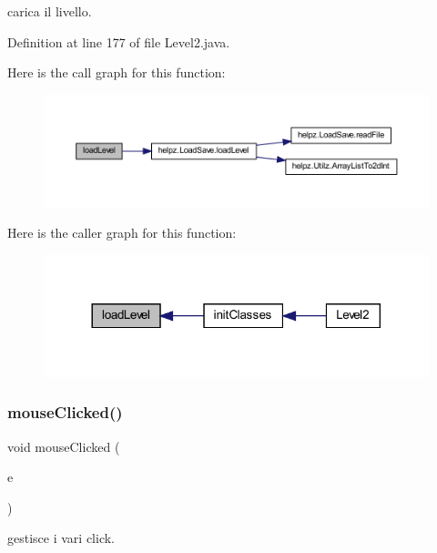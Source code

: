 carica il livello. 



Definition at line 177 of file Level2.\+java.

Here is the call graph for this function\+:\nopagebreak
\begin{figure}[H]
\begin{center}
\leavevmode
\includegraphics[width=350pt]{classscenes_1_1_level2_a286931cc46e197f4a85af7229fdc29a4_cgraph}
\end{center}
\end{figure}
Here is the caller graph for this function\+:\nopagebreak
\begin{figure}[H]
\begin{center}
\leavevmode
\includegraphics[width=317pt]{classscenes_1_1_level2_a286931cc46e197f4a85af7229fdc29a4_icgraph}
\end{center}
\end{figure}
\mbox{\label{classscenes_1_1_level2_a45d56bd84238e8b56589dfc732e2b2cf}} 
\subsubsection{\texorpdfstring{mouse\+Clicked()}{mouseClicked()}}
{\footnotesize\ttfamily void mouse\+Clicked (\begin{DoxyParamCaption}\item[{Mouse\+Event}]{e }\end{DoxyParamCaption})}



gestisce i vari click. 


